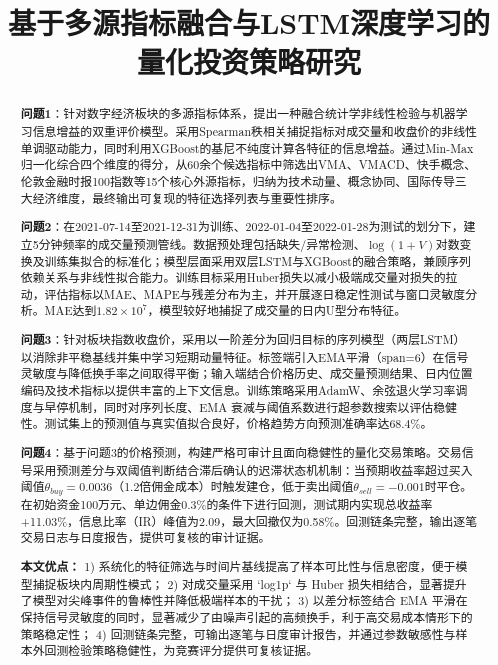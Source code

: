 \documentclass[withoutpreface,bwprint]{cumcmthesis}
\title{基于多源指标融合与LSTM深度学习的量化投资策略研究}
\begin{document}
\maketitle
\thispagestyle{empty}

\begin{abstract}\setlength{\parskip}{0.3\baselineskip}

\textbf{问题1}：针对数字经济板块的多源指标体系，提出一种融合统计学非线性检验与机器学习信息增益的双重评价模型。采用Spearman秩相关捕捉指标对成交量和收盘价的非线性单调驱动能力，同时利用XGBoost的基尼不纯度计算各特征的信息增益。通过Min-Max归一化综合四个维度的得分，从60余个候选指标中筛选出VMA、VMACD、快手概念、伦敦金融时报100指数等15个核心外源指标，归纳为技术动量、概念协同、国际传导三大经济维度，最终输出可复现的特征选择列表与重要性排序。

\textbf{问题2}：在2021-07-14至2021-12-31为训练、2022-01-04至2022-01-28为测试的划分下，建立5分钟频率的成交量预测管线。数据预处理包括缺失/异常检测、$\log(1+V)$对数变换及训练集拟合的标准化；模型层面采用双层LSTM与XGBoost的融合策略，兼顾序列依赖关系与非线性拟合能力。训练目标采用Huber损失以减小极端成交量对损失的拉动，评估指标以MAE、MAPE与残差分布为主，并开展逐日稳定性测试与窗口灵敏度分析。MAE达到$1.82\times10^7$，模型较好地捕捉了成交量的日内U型分布特征。

\textbf{问题3}：针对板块指数收盘价，采用以一阶差分为回归目标的序列模型（两层LSTM）以消除非平稳基线并集中学习短期动量特征。标签端引入EMA平滑（span=6）在信号灵敏度与降低换手率之间取得平衡；输入端结合价格历史、成交量预测结果、日内位置编码及技术指标以提供丰富的上下文信息。训练策略采用AdamW、余弦退火学习率调度与早停机制，同时对序列长度、EMA 衰减与阈值系数进行超参数搜索以评估稳健性。测试集上的预测值与真实值拟合良好，价格趋势方向预测准确率达68.4\%。

\textbf{问题4}：基于问题3的价格预测，构建严格可审计且面向稳健性的量化交易策略。交易信号采用预测差分与双阈值判断结合滞后确认的迟滞状态机机制：当预期收益率超过买入阈值$\theta_{buy}=0.0036$（1.2倍佣金成本）时触发建仓，低于卖出阈值$\theta_{sell}=-0.001$时平仓。在初始资金100万元、单边佣金0.3\%的条件下进行回测，测试期内实现总收益率+11.03\%，信息比率（IR）峰值为2.09，最大回撤仅为0.58\%。回测链条完整，输出逐笔交易日志与日度报告，提供可复核的审计证据。

\textbf{本文优点：}
1) 系统化的特征筛选与时间片基线提高了样本可比性与信息密度，便于模型捕捉板块内周期性模式；
2) 对成交量采用 `log1p` 与 Huber 损失相结合，显著提升了模型对尖峰事件的鲁棒性并降低极端样本的干扰；
3) 以差分标签结合 EMA 平滑在保持信号灵敏度的同时，显著减少了由噪声引起的高频换手，利于高交易成本情形下的策略稳定性；
4) 回测链条完整，可输出逐笔与日度审计报告，并通过参数敏感性与样本外回测检验策略稳健性，为竞赛评分提供可复核证据。

\end{abstract}
\end{document}
